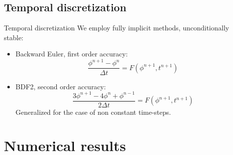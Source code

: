 \documentclass{beamer}
\begin{document}
\subsection*{Temporal discretization}
\begin{frame}{Temporal discretization}
We employ fully implicit methods, unconditionally stable:
\begin{itemize}
	\item Backward Euler, first order accuracy:
	\begin{equation*}
		\frac{\phi^{n+1}-\phi^n}{\Delta t} = F(\phi^{n+1}, t^{n+1})
	\end{equation*}
	\item BDF2, second order accuracy:
	\begin{equation*}
		\frac{3\phi^{n+1}- 4\phi^{n} + \phi^{n-1}}{2\Delta t} = F(\phi^{n+1}, 
		t^{n+1})
	\end{equation*}
	Generalized for the case of non constant time-steps.
\end{itemize}
\end{frame}
\section{Numerical results}
\end{document}
